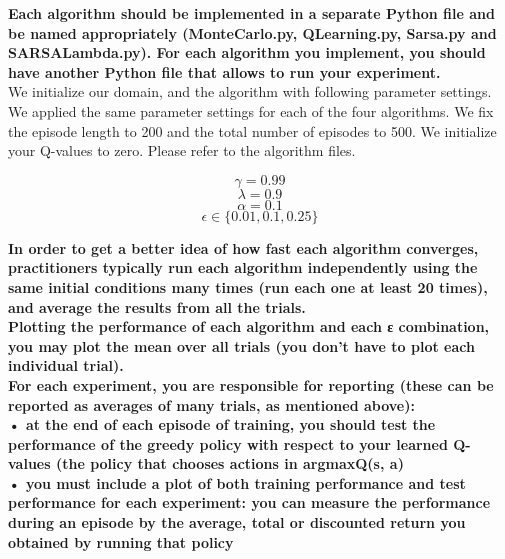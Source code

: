 \documentclass[11pt]{article}
\begin{document}
\noindent
\textbf{Each algorithm should be implemented in a separate Python file and be named appropriately (MonteCarlo.py, QLearning.py, Sarsa.py and SARSALambda.py). For each algorithm
you implement, you should have another Python file that allows to run your experiment.}
\\

\noindent
We initialize our domain, and the algorithm with following parameter
settings. We applied the same parameter settings for each of the four algorithms. We fix the episode length to 200 and the total number of episodes to 500.  We initialize your Q-values to zero. Please refer to the algorithm files.

\begin{equation}
\gamma = 0.99
\end{equation}
\begin{equation}
\lambda = 0.9
\end{equation}
\begin{equation}
\alpha = 0.1
\end{equation}
\begin{equation}
\epsilon \in\{0.01,0.1,0.25\}
\end{equation}

\noindent
\textbf{In order to get a better idea of how fast each algorithm converges, practitioners typically run each algorithm independently using the same initial
conditions many times (run each one at least 20 times), and average the results from
all the trials.}
\\

\noindent
\textbf{Plotting the performance of each algorithm and each ε combination, you may plot the
mean over all trials (you don’t have to plot each individual trial).}
\\

\noindent
\textbf{For each experiment, you are responsible for reporting (these can be reported as averages
of many trials, as mentioned above):}
\\

\noindent
\textbf{• at the end of each episode of training, you should test the performance of the greedy
policy with respect to your learned Q-values (the policy that chooses actions in argmaxQ(s, a)}
\\

\noindent
\textbf{• you must include a plot of both training performance and test performance for each
experiment: you can measure the performance during an episode by the average,
total or discounted return you obtained by running that policy}
\\
\end{document}
